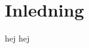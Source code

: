 \documentclass[designspec/spec.tex]{subfiles}
\begin{document}
\section{Inledning}

hej hej
\end{document}
